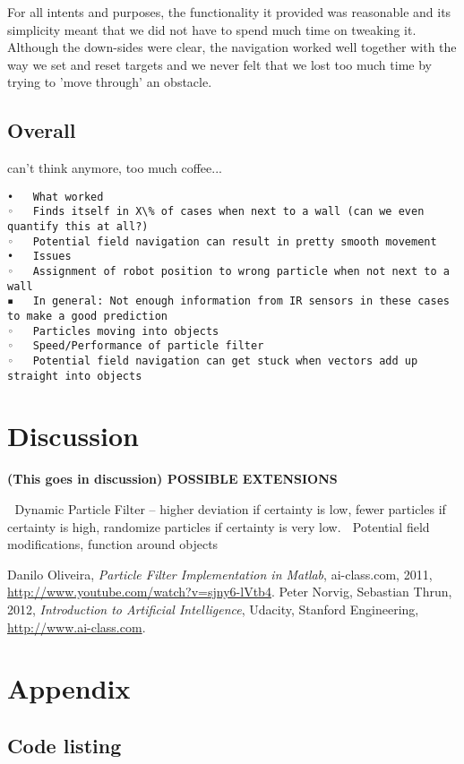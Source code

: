 \documentclass[paper=a4, fontsize=12pt]{scrartcl}	%
\numberwithin{equation}{section}		%
\numberwithin{figure}{section}			%
\numberwithin{table}{section}				%
\begin{document}
For all intents and purposes, the functionality it provided was reasonable and its simplicity meant that we did not have to spend much time on tweaking it. Although the down-sides were clear, the navigation worked well together with the way we set and reset targets and we never felt that we lost too much time by trying to 'move through' an obstacle.

\subsection{Overall}
can't think anymore, too much coffee...

\begin{verbatim}
•	What worked
◦	Finds itself in X\% of cases when next to a wall (can we even quantify this at all?)
◦	Potential field navigation can result in pretty smooth movement
•	Issues
◦	Assignment of robot position to wrong particle when not next to a wall
▪	In general: Not enough information from IR sensors in these cases to make a good prediction
◦	Particles moving into objects
◦	Speed/Performance of particle filter
◦	Potential field navigation can get stuck when vectors add up straight into objects
\end{verbatim}

\section{Discussion}
\textbf{(This goes in discussion) POSSIBLE EXTENSIONS}

	Dynamic Particle Filter – higher deviation if certainty is low, fewer particles if certainty is high, randomize particles if certainty is very low.
	Potential field modifications, function around objects

\begin{thebibliography}{9}
  Danilo Oliveira,
  \emph{Particle Filter Implementation in Matlab},
  ai-class.com,
  2011,
  \url{http://www.youtube.com/watch?v=sjny6-lVtb4}.
  Peter Norvig, Sebastian Thrun,
  2012,
  \emph{Introduction to Artificial Intelligence},
  Udacity, Stanford Engineering,
  \url{http://www.ai-class.com}.
\end{thebibliography}
\section{Appendix}
\subsection{Code listing}

\end{document}
